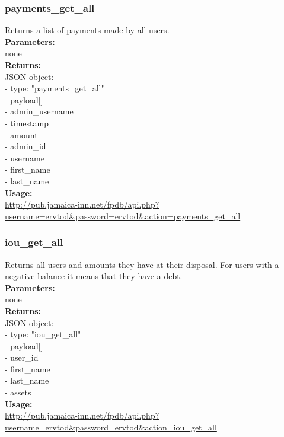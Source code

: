 \documentclass{article}
\begin{document}
\subsubsection{payments\_get\_all}
Returns a list of payments made by all users.\\
\textbf{Parameters:}\\
none\\
\textbf{Returns:}\\
JSON-object:\\
- type: "payments\_get\_all"\\
- payload[]\\
\indent - admin\_username\\
\indent - timestamp\\
\indent - amount\\
\indent - admin\_id\\
\indent - username\\
\indent - first\_name\\
\indent - last\_name\\
\textbf{Usage:}\\
\url{http://pub.jamaica-inn.net/fpdb/api.php?username=ervtod\&password=ervtod\&action=payments\_get\_all}\\
 
\subsubsection{iou\_get\_all}
Returns all users and amounts they have at their disposal. For users with a negative balance it means that they have a debt.\\
\textbf{Parameters:}\\
none\\
\textbf{Returns:}\\
JSON-object:\\
- type: "iou\_get\_all"\\
- payload[]\\
\indent - user\_id\\
\indent - first\_name\\
\indent - last\_name\\
\indent - assets\\
\textbf{Usage:}\\
\url{http://pub.jamaica-inn.net/fpdb/api.php?username=ervtod\&password=ervtod\&action=iou\_get\_all}\\
    
\end{document}
